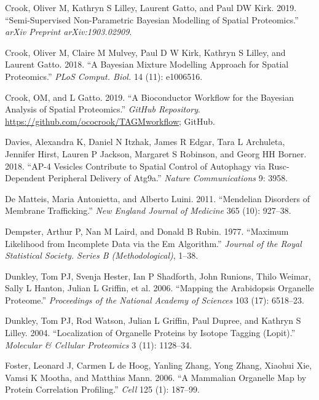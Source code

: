 \documentclass[
]{article}
\begin{document}
\leavevmode\hypertarget{ref-Crook:2019}{}%
Crook, Oliver M, Kathryn S Lilley, Laurent Gatto, and Paul DW Kirk.
2019. ``Semi-Supervised Non-Parametric Bayesian Modelling of Spatial
Proteomics.'' \emph{arXiv Preprint arXiv:1903.02909}.

\leavevmode\hypertarget{ref-Crook:2018}{}%
Crook, Oliver M, Claire M Mulvey, Paul D W Kirk, Kathryn S Lilley, and
Laurent Gatto. 2018. ``A Bayesian Mixture Modelling Approach for Spatial
Proteomics.'' \emph{PLoS Comput. Biol.} 14 (11): e1006516.

\leavevmode\hypertarget{ref-ghrepo}{}%
Crook, OM, and L Gatto. 2019. ``A Bioconductor Workflow for the Bayesian
Analysis of Spatial Proteomics.'' \emph{GitHub Repository}.
\url{https://github.com/ococrook/TAGMworkflow}; GitHub.

\leavevmode\hypertarget{ref-Davies:2018}{}%
Davies, Alexandra K, Daniel N Itzhak, James R Edgar, Tara L Archuleta,
Jennifer Hirst, Lauren P Jackson, Margaret S Robinson, and Georg HH
Borner. 2018. ``AP-4 Vesicles Contribute to Spatial Control of Autophagy
via Rusc-Dependent Peripheral Delivery of Atg9a.'' \emph{Nature
Communications} 9: 3958.

\leavevmode\hypertarget{ref-De:2011}{}%
De Matteis, Maria Antonietta, and Alberto Luini. 2011. ``Mendelian
Disorders of Membrane Trafficking.'' \emph{New England Journal of
Medicine} 365 (10): 927--38.

\leavevmode\hypertarget{ref-EM:1977}{}%
Dempster, Arthur P, Nan M Laird, and Donald B Rubin. 1977. ``Maximum
Likelihood from Incomplete Data via the Em Algorithm.'' \emph{Journal of
the Royal Statistical Society. Series B (Methodological)}, 1--38.

\leavevmode\hypertarget{ref-Dunkley:2006}{}%
Dunkley, Tom PJ, Svenja Hester, Ian P Shadforth, John Runions, Thilo
Weimar, Sally L Hanton, Julian L Griffin, et al. 2006. ``Mapping the
Arabidopsis Organelle Proteome.'' \emph{Proceedings of the National
Academy of Sciences} 103 (17): 6518--23.

\leavevmode\hypertarget{ref-Dunkley:2004}{}%
Dunkley, Tom PJ, Rod Watson, Julian L Griffin, Paul Dupree, and Kathryn
S Lilley. 2004. ``Localization of Organelle Proteins by Isotope Tagging
(Lopit).'' \emph{Molecular \& Cellular Proteomics} 3 (11): 1128--34.

\leavevmode\hypertarget{ref-Foster:2006}{}%
Foster, Leonard J, Carmen L de Hoog, Yanling Zhang, Yong Zhang, Xiaohui
Xie, Vamsi K Mootha, and Matthias Mann. 2006. ``A Mammalian Organelle
Map by Protein Correlation Profiling.'' \emph{Cell} 125 (1): 187--99.
\end{document}
